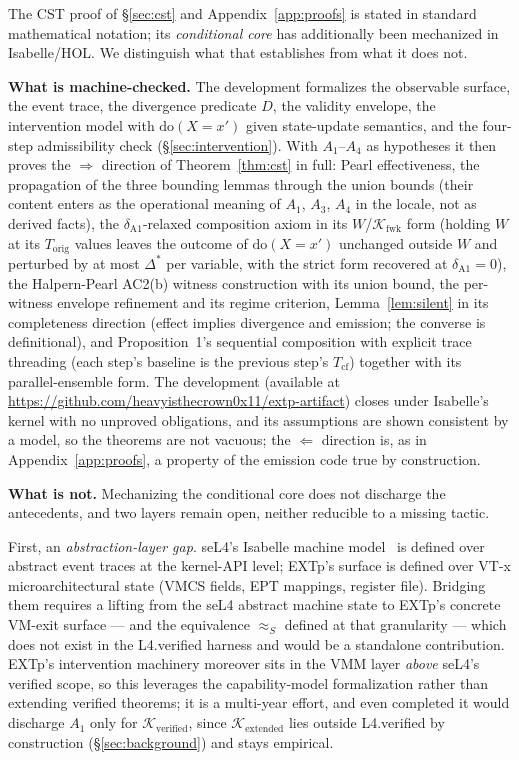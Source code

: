 \documentclass[conference]{IEEEtran}
\newcommand{\Korig}{T_\text{orig}}
\newcommand{\Tcf}{T_\text{cf}}
\newcommand{\Kverified}{\mathcal{K}_\text{verified}}
\newcommand{\Kextended}{\mathcal{K}_\text{extended}}
\newcommand{\Kfwk}{\mathcal{K}_\text{fwk}}
\newcommand{\Dstar}{\Delta^{*}}
\newcommand{\dox}[1]{\text{do}(X{=}#1)}
\newcommand{\artifacturl}{https://github.com/heavyisthecrown0x11/extp-artifact}
\begin{document}
The CST proof of \S\ref{sec:cst} and Appendix~\ref{app:proofs} is
stated in standard mathematical notation; its \emph{conditional
core} has additionally been mechanized in Isabelle/HOL. We
distinguish what that establishes from what it does not.

\textbf{What is machine-checked.} The development formalizes the
observable surface, the event trace, the divergence predicate $D$,
the validity envelope, the intervention model with $\dox{x'}$ given
state-update semantics, and the four-step admissibility check
(\S\ref{sec:intervention}). With $A_1$--$A_4$ as hypotheses it then
proves the $\Rightarrow$ direction of Theorem~\ref{thm:cst} in
full: Pearl effectiveness, the propagation of the three bounding
lemmas through the union bounds (their content enters as the
operational meaning of $A_1$, $A_3$, $A_4$ in the locale, not as
derived facts), the $\delta_{\text{A1}}$-relaxed composition axiom
in its $W$/$\Kfwk$ form (holding $W$ at its $\Korig$ values leaves
the outcome of $\dox{x'}$ unchanged outside $W$ and perturbed by at
most $\Dstar$ per variable, with the strict form recovered at
$\delta_{\text{A1}}{=}0$), the Halpern-Pearl AC2(b) witness
construction with its union bound, the per-witness envelope
refinement and its regime criterion, Lemma~\ref{lem:silent} in its
completeness direction (effect implies divergence and emission; the
converse is definitional), and Proposition~1's sequential
composition with explicit trace threading (each step's baseline is
the previous step's $\Tcf$) together with its parallel-ensemble
form. The development
(available at \url{\artifacturl})
closes under Isabelle's kernel with no unproved obligations, and
its assumptions are shown consistent by a model, so the theorems
are not vacuous; the $\Leftarrow$ direction is, as in
Appendix~\ref{app:proofs}, a property of the emission code true by
construction.

\textbf{What is not.} Mechanizing the conditional core does not
discharge the antecedents, and two layers remain open, neither
reducible to a missing tactic.

First, an \emph{abstraction-layer gap}. seL4's Isabelle machine
model~\cite{klein2014sel4} is defined over abstract event traces at
the kernel-API level; EXTp's surface is defined over VT-x
microarchitectural state (VMCS fields, EPT mappings, register
file). Bridging them requires a lifting from the seL4 abstract
machine state to EXTp's concrete VM-exit surface --- and the
equivalence $\approx_S$ defined at that granularity --- which does
not exist in the L4.verified harness and would be a standalone
contribution. EXTp's intervention machinery moreover sits in the
VMM layer \emph{above} seL4's verified scope, so this leverages the
capability-model formalization rather than extending verified
theorems; it is a multi-year effort, and even completed it would
discharge $A_1$ only for $\Kverified$, since $\Kextended$ lies
outside L4.verified by construction (\S\ref{sec:background}) and
stays empirical.
\end{document}
